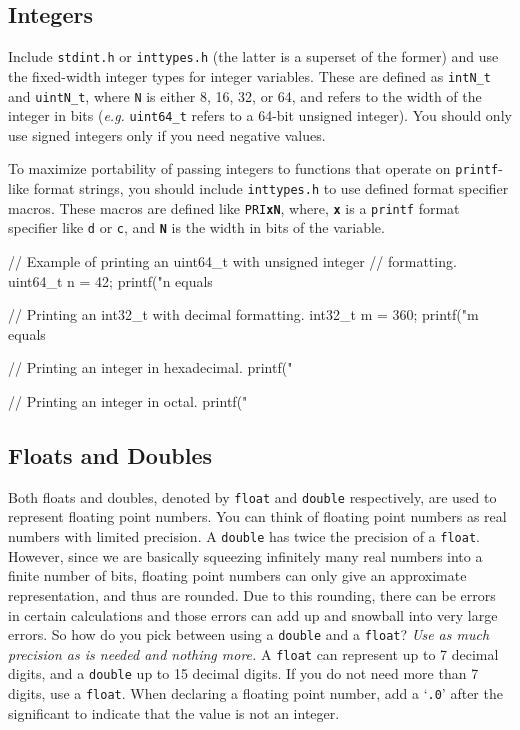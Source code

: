\documentclass[11pt]{article}
\begin{document}
\subsection{Integers}

\noindent Include \texttt{stdint.h} or \texttt{inttypes.h} (the latter is a
superset of the former) and use the fixed-width integer types for integer
variables.  These are defined as \texttt{intN\_t} and \texttt{uintN\_t}, where
\texttt{N} is either 8, 16, 32, or 64, and refers to the width of the integer in
bits (\emph{e.g.} \texttt{uint64\_t} refers to a 64-bit unsigned integer). You
should only use signed integers only if you need negative values.

To maximize portability of passing integers to functions that operate on
\texttt{printf}-like format strings, you should include \texttt{inttypes.h} to
use defined format specifier macros. These macros are defined like
\texttt{PRI\textbf{xN}}, where, \texttt{\textbf{x}} is a \texttt{printf} format
specifier like \texttt{d} or \texttt{c}, and \texttt{\textbf{N}} is the width in
bits of the variable.

\begin{codelisting}{}
// Example of printing an uint64_t with unsigned integer
// formatting.
uint64_t n = 42;
printf("n equals %

// Printing an int32_t with decimal formatting.
int32_t m = 360;
printf("m equals %

// Printing an integer in hexadecimal.
printf("%

// Printing an integer in octal.
printf("%
\end{codelisting}


\subsection{Floats and Doubles}

\noindent Both floats and doubles, denoted by \texttt{float} and \texttt{double}
respectively, are used to represent floating point numbers. You can think of
floating point numbers as real numbers with limited precision. A \texttt{double}
has twice the precision of a \texttt{float}. However, since we are basically
squeezing infinitely many real numbers into a finite number of bits, floating
point numbers can only give an approximate representation, and thus are rounded.
Due to this rounding, there can be errors in certain calculations and those errors
can add up and snowball into very large errors. So how do you pick between using a \texttt{double} and a
\texttt{float}? \emph{Use as much precision as is needed and nothing more.} A
\texttt{float} can represent up to 7 decimal digits, and a \texttt{double} up to
15 decimal digits. If you do not need more than 7 digits, use a \texttt{float}.
When declaring a floating point number, add a `\texttt{.0}' after the significant to
indicate that the value is not an integer.
\end{document}
